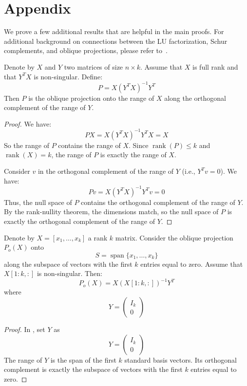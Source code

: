 \documentclass[10pt,twoside]{siamart1116}
\DeclareMathOperator{\rk}{rank}
\DeclareMathOperator{\spn}{span}
\newcommand{\by}{\times}
\numberwithin{theorem}{section}
\begin{document}
\section{Appendix}\label{sec:appendix}

We prove a few additional results that are helpful in the main proofs. For additional background on connections between the LU factorization, Schur complements, and oblique projections, please refer to~\cite{Ouellette_1981,Zhang_2006,Householder_2013}.

\begin{lemma}\label{lem:oblique_projection}
	Denote by $X$ and $Y$ two matrices of size $n \by k$. Assume that $X$ is full rank and that $Y^T X$ is non-singular. Define:
	\[ P = X {(Y^T X)}^{-1} Y^T \]
	Then $P$ is the oblique projection onto the range of $X$ along the orthogonal complement of the range of $Y$.
\end{lemma}

\begin{proof}
	We have:
	\[ P X = X {(Y^T X)}^{-1} Y^T X = X \]
	So the range of $P$ contains the range of $X$. Since $\rk(P) \le k$ and $\rk(X)=k$, the range of $P$ is exactly the range of $X$.

	Consider $v$ in the orthogonal complement of the range of $Y$ (i.e., $Y^T v = 0$). We have:
	\[ P v = X {(Y^T X)}^{-1} Y^T v = 0 \]
	Thus, the null space of $P$ contains the orthogonal complement of the range of $Y$. By the rank-nullity theorem, the dimensions match, so the null space of $P$ is exactly the orthogonal complement of the range of $Y$.
\end{proof}

\begin{lemma}\label{lem:oblique_projection_specific}
	Denote by $X = [x_1, \ldots, x_k]$ a rank $k$ matrix. Consider the oblique projection $P_o(X)$ onto
	\[ S = \spn\{ x_1,\dots,x_k \} \] %
	along the subspace of vectors with the first $k$ entries equal to zero. Assume that $X[1:k,:]$ is non-singular. Then:
	\[ P_o(X) = X {(X[1:k,:])}^{-1} Y^T \]
	where
	\[ Y = \begin{pmatrix}
			I_k \\ 0
		\end{pmatrix} \]
\end{lemma}

\begin{proof}
	In , set $Y$ as
	\[ Y = \begin{pmatrix}
			I_k \\ 0
		\end{pmatrix} \]
	The range of $Y$ is the span of the first $k$ standard basis vectors. Its orthogonal complement is exactly the subspace of vectors with the first $k$ entries equal to zero.
\end{proof}
\end{document}

